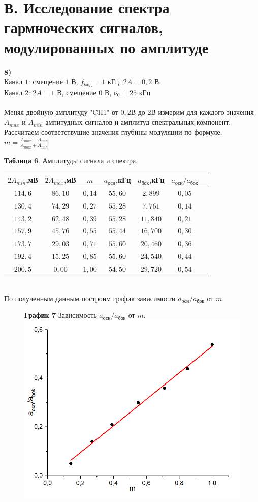 \documentclass[11pt,a4paper]{article}
\begin{document}
\part*{В. Исследование спектра гармноческих сигналов, модулированных по амплитуде}
\textbf{8)} \\
Канал $1$: смещение $1$ В, $f_{\text{мод}} = 1$ кГц, $2A = 0,2$ В.\\
Канал $2$: $2A=1$ В, смещение $0$ В, $\nu_0=25$ кГц \\\\
Меняя двойную амплитуду "CH1" от $0,2$В до 2В измерим для каждого значения $A_{max}$ и $A_{min}$ ампитудных сигналов и амплитуд спектральных компонент. Рассчитаем соответствущие значения глубины модуляции по формуле:\\
$m = \frac{A_{max}-A_{min}}{A_{max}+A_{min}}$
	\begin{table} [h!]
	\centering
	\textbf{Таблица 6}. Амплитуды сигнала и спектра.
	\begin{tabular}{|c|c|c|c|c|c|c|}
		\hline 
		$2A_{min}$,мВ & $2A_{max}$,мВ & $m$ & $a_{\text{осн}}$,кГц & $a_{\text{бок}}$,кГц & $a_{\text{осн}} / a_{\text{бок}}$ \\ \hline
		$114,6$ & $86,10$ & $0,14$ & $55,60$ & $2,899$ & $0,05$ \\ \hline
		$130,4$ & $74,29$ & $0,27$ & $55,28$ & $7,761$ & $0,14$ \\ \hline
		$143,2$ & $62,48$ & $0,39$ & $55,28$ & $11,840$ & $0,21$ \\ \hline
		$157,9$ & $45,76$ & $0,55$ & $55,44$ & $16,700$ & $0,30$ \\ \hline
		$173,7$ & $29,03$ & $0,71$ & $55,60$ & $20,460$ & $0,36$ \\ \hline
		$192,4$ & $15,25$ & $0,85$ & $55,60$ & $24,540$ & $0,44$ \\ \hline
		$200,5$ & $0,00$ & $1,00$ & $54,50$ & $29,720$ & $0,54$ \\ \hline
	\end{tabular}
\end{table}
\\
По полученным данным построим график зависимости $a_{\text{осн}} / a_{\text{бок}}$ от $m$.
\\
\begin{figure} [h!]
	\centering
	\textbf{График 7} Зависимость $a_{\text{осн}} / a_{\text{бок}}$ от $m$. \\
	\centering
	\includegraphics[width=0.55\linewidth]{4}
\end{figure}
\end{document}
